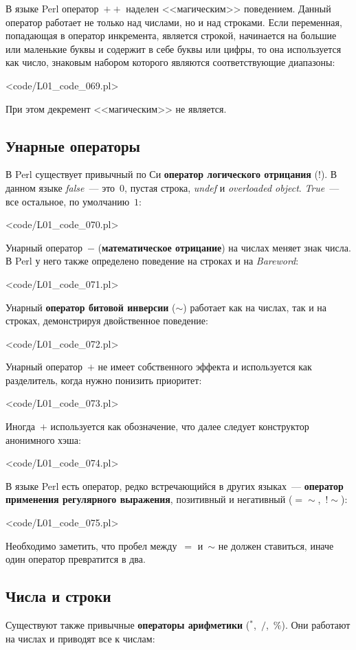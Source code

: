 В языке Perl оператор~$++$ наделен <<магическим>> поведением.
Данный оператор работает не только над числами, но и над строками.
Если переменная, попадающая в оператор инкремента, является строкой, начинается на большие или маленькие буквы и содержит в себе буквы или цифры, то она используется как число, знаковым набором которого являются соответствующие диапазоны:

\pr<code/L01_code_069.pl>

При этом декремент <<магическим>> не является.

\subsection{Унарные операторы}
В Perl существует привычный по Си \textbf{оператор логического отрицания} ($!$).
В данном языке \textit{false}~--- это~$0$, пустая строка, \textit{undef} и \textit{overloaded object}.
\textit{True}~--- все остальное, по умолчанию~$1$:

\pr<code/L01_code_070.pl>

Унарный оператор~$-$ (\textbf{математическое отрицание}) на числах меняет знак числа.
В Perl у него также определено поведение на строках и на \textit{Bareword}:

\pr<code/L01_code_071.pl>

Унарный \textbf{оператор битовой инверсии} ($\sim$) работает как на числах, так и на строках, демонстрируя двойственное поведение:

\pr<code/L01_code_072.pl>

Унарный оператор~$+$ не имеет собственного эффекта и используется как разделитель, когда нужно понизить приоритет:

\pr<code/L01_code_073.pl>

Иногда~$+$ используется как обозначение, что далее следует конструктор анонимного хэша:

\pr<code/L01_code_074.pl>

В языке Perl есть оператор, редко встречающийся в других языках~--- \textbf{оператор применения регулярного выражения}, позитивный и негативный ($=\sim$,~$!\sim$):

\pr<code/L01_code_075.pl>

Необходимо заметить, что пробел между~$=$ и~$\sim$ не должен ставиться, иначе один оператор превратится в два.

\subsection{Числа и строки}
Существуют также привычные \textbf{операторы арифметики} ($^{\ast}$,~$/$,~$\%$).
Они работают на числах и приводят все к числам:

